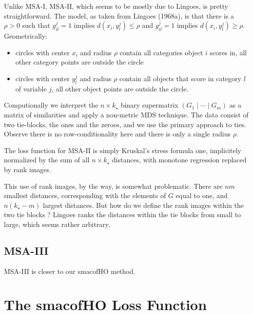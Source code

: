 \documentclass[
  12pt,
]{article}
\providecommand{\tightlist}{%
  \setlength{\itemsep}{0pt}\setlength{\parskip}{0pt}}
\begin{document}
Unlike MSA-I, MSA-II, which seems to be mostly due to Lingoes, is
pretty straightforward. The model, as taken from Lingoes (1968a), is that
there is a \(\rho>0\) such that \(g_{il}^j=1\) implies \(d(x_i,y_l^j)\leq\rho\)
and \(g_{il}^j=1\) implies \(d(x_i,y_l^j)\geq\rho\). Geometrically:

\begin{itemize}
\tightlist
\item
  circles with center \(x_i\) and radius \(\rho\) contain all categories
  object \(i\) scores in, all other category points are outside the circle
\item
  circles with center \(y_l^j\) and radius \(\rho\) contain all objects that score in category \(l\) of variable \(j\), all other object points are
  outside the circle.
\end{itemize}

Computionally we interpret the \(n\times k_\star\) binary supermatrix
\((G_1\mid\cdots\mid G_m)\) as a matrix of similarities and apply
a non-metric MDS technique. The data consist of two tie-blocks,
the ones and the zeroes, and we use the primary approach to ties.
Observe there is no row-conditionality here and there is only a single
radius \(\rho\).

The loss function for MSA-II is simply Kruskal's stress formula one,
implicitely normalized by the sum of all \(n\times k_\star\)
distances, with monotone regression replaced by rank images.

This use of rank images, by the way, is somewhat problematic.
There are \(nm\) smallest distances, corresponding with the
elements of \(G\) equal to one, and \(n(k_\star-m)\) largest distances.
But how do we define the rank images within the two tie blocks ?
Lingoes ranks the distances within the tie blocks from small to large, which seems rather arbitrary.

\subsection{MSA-III}\label{msa-iii}

MSA-III is closer to our smacofHO method.

\section{The smacofHO Loss Function}\label{the-smacofho-loss-function}
\end{document}
